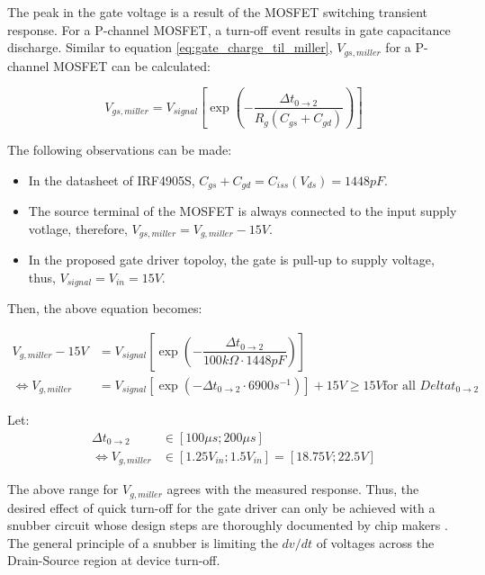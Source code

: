 \documentclass[../main.tex]{subfiles}
\begin{document}
    \pagebreak
    \justify
    The peak in the gate voltage is a result of the MOSFET switching transient response. For a P-channel MOSFET, a turn-off event results in gate capacitance discharge. Similar to equation \eqref{eq:gate_charge_til_miller}, $V_{gs, miller}$ for a P-channel MOSFET can be calculated:

    \begin{equation}
        V_{gs, miller} = V_{signal}\left[\exp{\left(-\dfrac{\Delta t_{0\rightarrow2}}{R_{g}(C_{gs} +C_{gd})}\right)}\right]
    \end{equation}

    \justify
    The following observations can be made:
    \begin{itemize}
        \item In the datasheet of IRF4905S, $C_{gs} +C_{gd} = C_{iss}(V_{ds}) = 1448pF$. 
        \item The source terminal of the MOSFET is always connected to the input supply votlage, therefore, $V_{gs, miller}=V_{g, miller} - 15V$.
        \item In the proposed gate driver topoloy, the gate is pull-up to supply voltage, thus, $V_{signal} = V_{in} = 15V$.
    \end{itemize}
    \justify
    Then, the above equation becomes:
    
    \begin{equation}
    \begin{split}
        V_{g, miller} - 15V &= V_{signal}\left[\exp{\left(-\dfrac{\Delta t_{0\rightarrow2}}{100k\Omega\cdot 1448pF}\right)}\right] \\
        \Leftrightarrow V_{g, miller} &= V_{signal}\left[\exp{\left(-\Delta t_{0\rightarrow2}\cdot 6900 s^{-1}\right)}\right] + 15V \geq 15V \text{for all } Delta t_{0\rightarrow2}       
    \end{split}
    \end{equation}

    \justify
    Let:
    \begin{equation}
    \begin{split}
        \Delta t_{0\rightarrow2} &\in [100\mu s;200\mu s] \\
        \Leftrightarrow V_{g, miller} &\in [1.25V_{in}; 1.5V_{in}] = [18.75V; 22.5V]
    \end{split}
    \end{equation}

    \justify
    The above range for $V_{g, miller}$ agrees with the measured response. Thus, the desired effect of quick turn-off for the gate driver can only be achieved with a snubber circuit whose design steps are thoroughly documented by chip makers \cite{RohmSnubber} \cite{InfineonSnubber}. The general principle of a snubber is limiting the $dv/dt$ of voltages across the Drain-Source region at device turn-off. 
\end{document}
